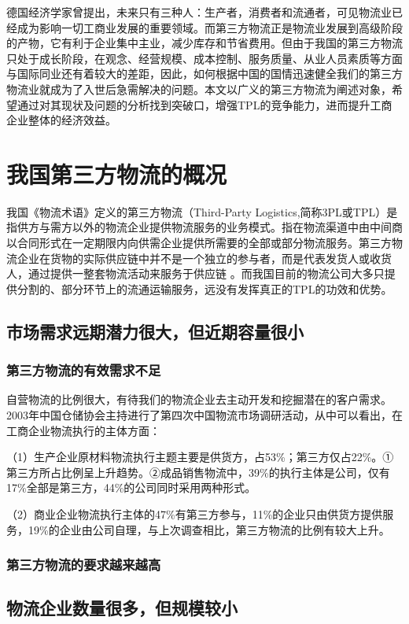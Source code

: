 \documentclass[UTF-8]{CUFEpaper}
\begin{document}
德国经济学家曾提出，未来只有三种人：生产者，消费者和流通者，可见物流业已经成为影响一切工商业发展的重要领域。而第三方物流正是物流业发展到高级阶段的产物，它有利于企业集中主业，减少库存和节省费用。但由于我国的第三方物流只处于成长阶段，在观念、经营规模、成本控制、服务质量、从业人员素质等方面与国际同业还有着较大的差距，因此，如何根据中国的国情迅速健全我们的第三方物流业就成为了入世后急需解决的问题。本文以广义的第三方物流为阐述对象，希望通过对其现状及问题的分析找到突破口，增强TPL的竞争能力，进而提升工商企业整体的经济效益。

\section{我国第三方物流的概况}
我国《物流术语》定义的第三方物流（Third-Party Logistics,简称3PL或TPL）是指供方与需方以外的物流企业提供物流服务的业务模式。指在物流渠道中由中间商以合同形式在一定期限内向供需企业提供所需要的全部或部分物流服务。第三方物流企业在货物的实际供应链中并不是一个独立的参与者，而是代表发货人或收货人，通过提供一整套物流活动来服务于供应链 。而我国目前的物流公司大多只提供分割的、部分环节上的流通运输服务，远没有发挥真正的TPL的功效和优势。
\subsection{市场需求远期潜力很大，但近期容量很小}
\subsubsection{第三方物流的有效需求不足}

自营物流的比例很大，有待我们的物流企业去主动开发和挖掘潜在的客户需求。2003年中国仓储协会主持进行了第四次中国物流市场调研活动，从中可以看出，在工商企业物流执行的主体方面：

（1）生产企业原材料物流执行主题主要是供货方，占53\%；第三方仅占22\%。①第三方所占比例呈上升趋势。②成品销售物流中，39\%的执行主体是公司，仅有17\%全部是第三方，44\%的公司同时采用两种形式。

（2）商业企业物流执行主体的47\%有第三方参与，11\%的企业只由供货方提供服务，19\%的企业由公司自理，与上次调查相比，第三方物流的比例有较大上升。

\subsubsection{第三方物流的要求越来越高}
\subsection{物流企业数量很多，但规模较小}
\end{document}
